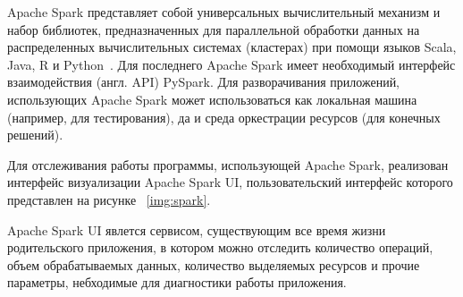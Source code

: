 Apache Spark представляет собой универсальных вычислительный механизм и набор библиотек, предназначенных для параллельной
обработки данных на распределенных вычислительных системах (кластерах) при помощи языков Scala, Java, R и 
Python~\autocite{impl:spark-overview}. Для последнего Apache Spark имеет необходимый интерфейс взаимодействия (англ. API) 
PySpark. Для разворачивания приложений, использующих Apache Spark может использоваться как локальная машина (например, 
для тестирования), да и среда оркестрации ресурсов (для конечных решений).

Для отслеживания работы программы, использующей Apache Spark, реализован интерфейс визуализации  Apache Spark UI, пользовательский
интерфейс которого представлен на рисунке ~\ref{img:spark}.

Apache Spark UI явлется сервисом, существующим все время жизни родительского приложения, в котором можно отследить количество операций,
объем обрабатываемых данных, количество выделяемых ресурсов и прочие параметры, небходимые для диагностики работы приложения.

